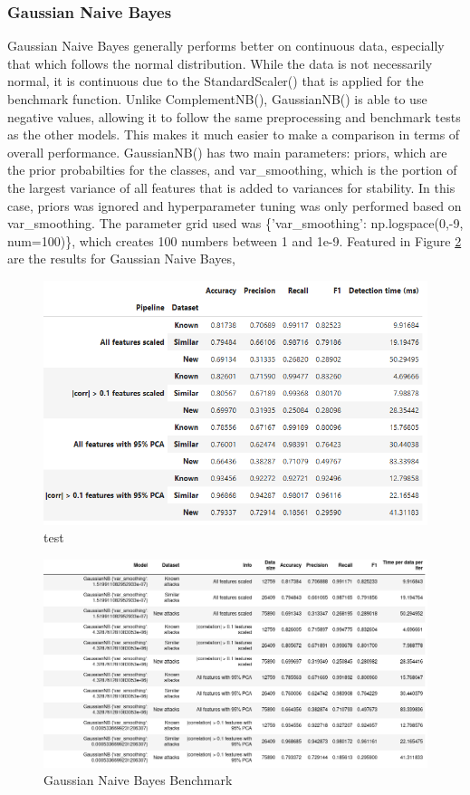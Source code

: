 \subsubsection{Gaussian Naive Bayes}
Gaussian Naive Bayes generally performs better on continuous data, especially that which follows the normal distribution. While the data is not necessarily normal, it is continuous due to the StandardScaler() that is applied for the benchmark function. Unlike ComplementNB(), GaussianNB() is able to use negative values, allowing it to follow the same preprocessing and benchmark tests as the other models. This makes it much easier to make a comparison in terms of overall performance. GaussianNB() has two main parameters: priors, which are the prior probabilties for the classes, and var\_smoothing, which is the portion of the largest variance of all features that is added to variances for stability. In this case, priors was ignored and hyperparameter tuning was only performed based on var\_smoothing. The parameter grid used was \{'var\_smoothing': np.logspace(0,-9, num=100)\}, which creates 100 numbers between 1 and 1e-9.
Featured in Figure \ref{fig:gaus_nb_bench} are the results for Gaussian Naive Bayes,
\begin{figure}
    \centering
    \includegraphics[width=1\linewidth]{figures//naive_bayes/gaus_nb_bench_pretty.png}
    \caption{test}
    \label{fig:enter-label}
\end{figure}
\begin{figure}
    \centering
    \includegraphics[width=1\linewidth]{figures//naive_bayes/gaus_nb_bench.png}
    \caption{Gaussian Naive Bayes Benchmark}
    \label{fig:gaus_nb_bench}
\end{figure}

